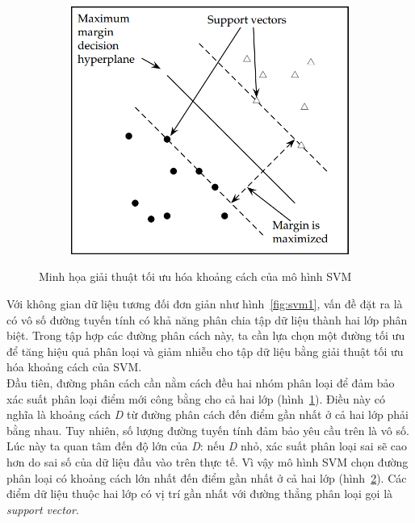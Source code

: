 \begin{figure}[h]
\begin{subfigure}[b]{0.325\textwidth}
        \caption{ }
        \label{fig:svm2}
    \end{subfigure}
    \begin{subfigure}[b]{0.325\textwidth}    \centering
        \includegraphics[width=\textwidth]{hinh/SVM4.png}
        \caption{ }
        \label{fig:svm3}
    \end{subfigure}
    \caption[Caption for LOF]{Minh họa giải thuật tối ưu hóa khoảng cách của mô hình SVM \footnotemark}
    \label{fig:svm}
\end{figure}
Với không gian dữ liệu tương đối đơn giản như hình~\ref{fig:svm1}, vấn đề đặt ra là có vô số đường tuyến tính có khả năng phân chia tập dữ liệu thành hai lớp phân biệt. Trong tập hợp các đường phân cách này, ta cần lựa chọn một đường tối ưu để tăng hiệu quả phân loại và giảm nhiễu cho tập dữ liệu bằng giải thuật tối ưu hóa khoảng cách của SVM.\\

Đầu tiên, đường phân cách cần nằm cách đều hai nhóm phân loại để đảm bảo xác suất phân loại điểm mới công bằng cho cả hai lớp (hình~\ref{fig:svm2}). Điều này có nghĩa là khoảng cách \textit{D} từ đường phân cách đến điểm gần nhất ở cả hai lớp  phải bằng nhau. Tuy nhiên, số lượng đường tuyến tính đảm bảo yêu cầu trên là vô số. Lúc này ta quan tâm đến độ lớn của \textit{D}: nếu \textit{D} nhỏ, xác suất phân loại sai sẽ cao hơn do sai số của dữ liệu đầu vào trên thực tế. Vì vậy mô hình SVM chọn đường phân loại có khoảng cách lớn nhất đến điểm gần nhất ở cả hai lớp (hình~\ref{fig:svm3}). Các điểm dữ liệu thuộc hai lớp có vị trí gần nhất với đường thẳng phân loại gọi là \textit{support vector}.

